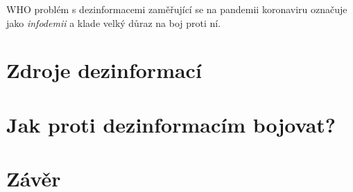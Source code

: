 WHO problém s dezinformacemi zaměřující se na pandemii koronaviru označuje jako \textit{infodemii} a klade velký důraz na boj proti ní.

\section{Zdroje dezinformací}

\section{Jak proti dezinformacím bojovat?}

\section{Závěr}